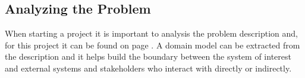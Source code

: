 \subsection{Analyzing the Problem}
When starting a project it is important to analysis the problem description and, for this project it can be found on page \pageref{sc:problemdescription}. A domain model can be extracted from the description and it helps build the boundary between the system of interest and external systems and stakeholders who interact with directly or indirectly. 